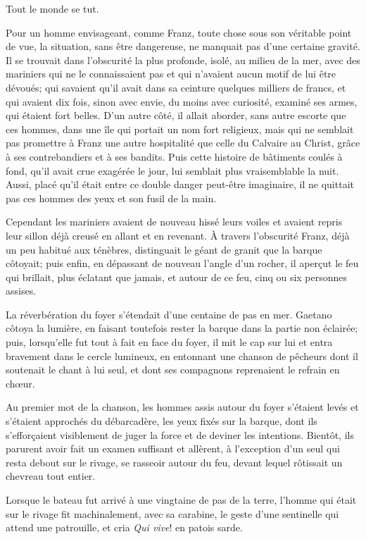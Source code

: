 Tout le monde se tut.

Pour un homme envisageant, comme Franz, toute chose sous son véritable point de vue, la situation, sans être dangereuse, ne manquait pas d'une certaine gravité. Il se trouvait dans l'obscurité la plus profonde, isolé, au milieu de la mer, avec des mariniers qui ne le connaissaient pas et qui n'avaient aucun motif de lui être dévoués; qui savaient qu'il avait dans sa ceinture quelques milliers de francs, et qui avaient dix fois, sinon avec envie, du moins avec curiosité, examiné ses armes, qui étaient fort belles. D'un autre côté, il allait aborder, sans autre escorte que ces hommes, dans une île qui portait un nom fort religieux, mais qui ne semblait pas promettre à Franz une autre hospitalité que celle du Calvaire au Christ, grâce à ses contrebandiers et à ses bandits. Puis cette histoire de bâtiments coulés à fond, qu'il avait crue exagérée le jour, lui semblait plus vraisemblable la nuit. Aussi, placé qu'il était entre ce double danger peut-être imaginaire, il ne quittait pas ces hommes des yeux et son fusil de la main.

Cependant les mariniers avaient de nouveau hissé leurs voiles et avaient repris leur sillon déjà creusé en allant et en revenant. À travers l'obscurité Franz, déjà un peu habitué aux ténèbres, distinguait le géant de granit que la barque côtoyait; puis enfin, en dépassant de nouveau l'angle d'un rocher, il aperçut le feu qui brillait, plus éclatant que jamais, et autour de ce feu, cinq ou six personnes assises.

La réverbération du foyer s'étendait d'une centaine de pas en mer. Gaetano côtoya la lumière, en faisant toutefois rester la barque dans la partie non éclairée; puis, lorsqu'elle fut tout à fait en face du foyer, il mit le cap sur lui et entra bravement dans le cercle lumineux, en entonnant une chanson de pêcheurs dont il soutenait le chant à lui seul, et dont ses compagnons reprenaient le refrain en chœur.

Au premier mot de la chanson, les hommes assis autour du foyer s'étaient levés et s'étaient approchés du débarcadère, les yeux fixés sur la barque, dont ils s'efforçaient visiblement de juger la force et de deviner les intentions. Bientôt, ils parurent avoir fait un examen suffisant et allèrent, à l'exception d'un seul qui resta debout sur le rivage, se rasseoir autour du feu, devant lequel rôtissait un chevreau tout entier.

Lorsque le bateau fut arrivé à une vingtaine de pas de la terre, l'homme qui était sur le rivage fit machinalement, avec sa carabine, le geste d'une sentinelle qui attend une patrouille, et cria \textit{Qui vive}! en patois sarde.

